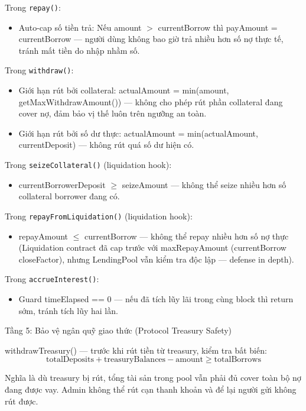 \documentclass[../DoAn.tex]{subfiles}
\begin{document}
Trong \texttt{repay()}:
\begin{itemize}
  \item Auto-cap số tiền trả: Nếu amount $>$ currentBorrow thì payAmount = currentBorrow --- người dùng không bao giờ trả nhiều hơn số nợ thực tế, tránh mất tiền do nhập nhầm số.
\end{itemize}

Trong \texttt{withdraw()}:
\begin{itemize}
  \item Giới hạn rút bởi collateral: actualAmount = min(amount, getMaxWithdrawAmount()) --- không cho phép rút phần collateral đang cover nợ, đảm bảo vị thế luôn trên ngưỡng an toàn.
  \item Giới hạn rút bởi số dư thực: actualAmount = min(actualAmount, currentDeposit) --- không rút quá số dư hiện có.
\end{itemize}

Trong \texttt{seizeCollateral()} (liquidation hook):
\begin{itemize}
  \item currentBorrowerDeposit $\geq$ seizeAmount --- không thể seize nhiều hơn số collateral borrower đang có.
\end{itemize}

Trong \texttt{repayFromLiquidation()} (liquidation hook):
\begin{itemize}
  \item repayAmount $\leq$ currentBorrow --- không thể repay nhiều hơn số nợ thực (Liquidation contract đã cap trước với maxRepayAmount (currentBorrow \* closeFactor), nhưng LendingPool vẫn kiểm tra độc lập --- defense in depth).
\end{itemize}

Trong \texttt{accrueInterest()}:
\begin{itemize}
  \item Guard timeElapsed == 0 --- nếu đã tích lũy lãi trong cùng block thì return sớm, tránh tích lũy hai lần.
\end{itemize}


Tầng 5: Bảo vệ ngân quỹ giao thức (Protocol Treasury Safety)

withdrawTreasury() --- trước khi rút tiền từ treasury, kiểm tra bất biến:
\begin{equation}
\mathrm{totalDeposits} + \mathrm{treasuryBalances} - \mathrm{amount} \geq \mathrm{totalBorrows}
\label{eq:treasury_invariant}
\end{equation}


Nghĩa là dù treasury bị rút, tổng tài sản trong pool vẫn phải đủ cover toàn bộ nợ đang được vay. Admin không thể rút cạn thanh khoản và để lại người gửi không rút được.
\end{document}
